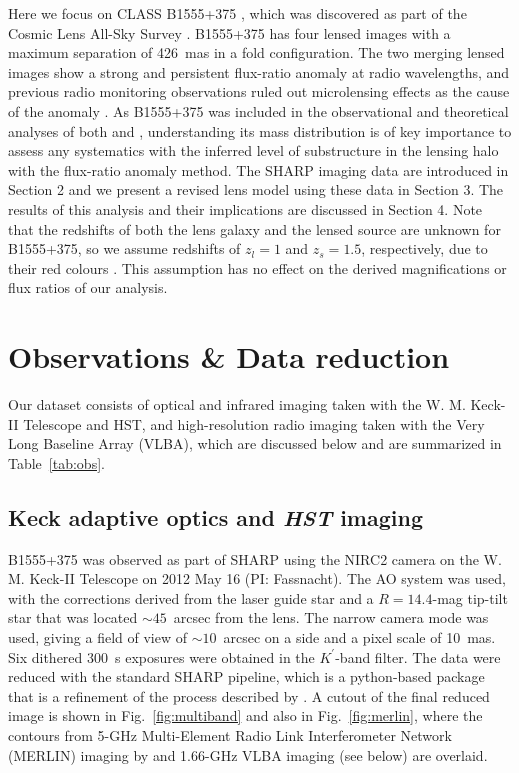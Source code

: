 \documentclass[a4paper,fleqn,usenatbib,useAMS]{mnras}
\begin{document}
Here we focus on CLASS B1555+375 \citep{Marlow99}, which was discovered as part of the Cosmic Lens All-Sky Survey \citep{CLASS1,CLASS2}. B1555+375 has four lensed images with a maximum separation of 426~mas in a fold configuration.  The two merging lensed images show a strong and persistent flux-ratio anomaly at radio wavelengths, and previous radio monitoring observations ruled out microlensing effects as the cause of the anomaly \citep{K03}. As B1555+375 was included in the observational and theoretical analyses of both \citet{Dalal2002} and \citet{Xu15}, understanding its mass distribution is of key importance to assess any systematics with the inferred level of substructure in the lensing halo with the flux-ratio anomaly method. The SHARP imaging data are introduced in Section 2 and we present a revised lens model using these data in Section 3. The results of this analysis and their implications are discussed in Section 4. Note that the redshifts of both the lens galaxy and the lensed source are unknown for B1555+375, so we assume redshifts of $z_l = 1$ and $z_s = 1.5$, respectively, due to their red colours \citep{Marlow99}. This assumption has no effect on the derived magnifications or flux ratios of our analysis.

\section{Observations \& Data reduction}

Our dataset consists of optical and infrared imaging taken with the W. M. Keck-II Telescope and HST, and high-resolution radio imaging taken with the Very Long Baseline Array (VLBA), which are discussed below and are summarized in Table~\ref{tab:obs}.

\subsection{Keck adaptive optics and {\it HST} imaging}

B1555+375 was observed as part of SHARP using the NIRC2 camera on the W. M. Keck-II Telescope on 2012 May 16 (PI: Fassnacht).  The AO system was used, with the corrections derived from the laser guide star and a $R=14.4$-mag tip-tilt star that was located $\sim45$~arcsec from the lens.  The narrow camera mode was used, giving a field of view of $\sim10$~arcsec on a side and a pixel scale of 10~mas. Six dithered 300~s exposures were obtained in the $K^{\prime}$-band filter.  The data were reduced with the standard SHARP pipeline, which is a python-based package that is a refinement of the process described by \citet{Auger_EELS1}.  A cutout of the final reduced image is shown in Fig.~\ref{fig:multiband} and also in Fig.~\ref{fig:merlin}, where the contours from 5-GHz Multi-Element Radio Link Interferometer Network (MERLIN) imaging by \citet{Marlow99} and 1.66-GHz VLBA imaging (see below) are overlaid.
\end{document}
